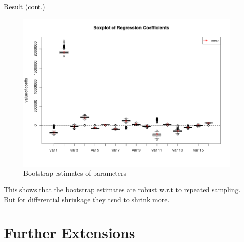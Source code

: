 \documentclass[tikz]{beamer}					%
\begin{document}
{
\begin{frame}{Result (cont.)}
\begin{figure}
    \centering
    \includegraphics[width = 0.65\linewidth]{figures/bootstrap_gaia.png}
    \caption{Bootstrap estimates of parameters}
\end{figure}
This shows that the bootstrap estimates are robust w.r.t to
repeated sampling. But for differential shrinkage they tend
to shrink more.
\end{frame}
}


\section{Further Extensions}
\end{document}
